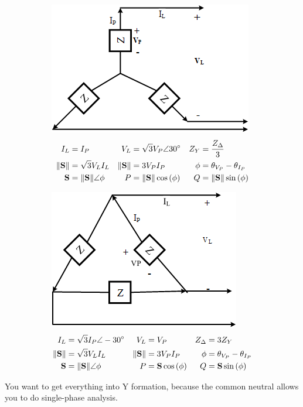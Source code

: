 \documentclass[10pt,letterpaper,final,twoside,notitlepage]{article}
\begin{document}
	\begin{figure} %
		\begin{subfigure}{0.5\textwidth} %
			\centering
			\includegraphics[scale=0.4]{3Phase-Y.png}
			\label{subfig:3 Phase-Y}
			\begin{align*}
				I_{L} &= I_{P} &
				V_{L} &= \sqrt{3} V_{P} \angle 30 \degree &
				Z_{Y} &= \frac{Z_{\Delta}}{3} \\
				\lVert \mathbf{S} \rVert &= \sqrt{3} V_{L} I_{L} &
				\lVert \mathbf{S} \rVert &= 3 V_{P} I_{P} &
				\phi &= \theta_{V_{P}} - \theta_{I_{P}} \\
				\mathbf{S} &= \lVert \mathbf{S} \rVert \angle \phi &
				P &= \lVert \mathbf{S} \rVert \cos \left( \phi \right) &
				Q &= \lVert \mathbf{S} \rVert \sin \left( \phi \right) \\
			\end{align*}
		\end{subfigure}
		\vline
		\begin{subfigure}{0.5\textwidth} %
			\centering
			\includegraphics[scale=0.4]{3Phase-Delta.png}
				\begin{align*}
					I_{L} &= \sqrt{3} I_{P} \angle -30 \degree &
					V_{L} &= V_{P} &
					Z_{\Delta} &= 3 Z_{Y} \\
					\lVert \mathbf{S} \rVert &= \sqrt{3} V_{L} I_{L} &
					\lVert \mathbf{S} \rVert &= 3 V_{P} I_{P} &
					\phi &= \theta_{V_{P}} - \theta_{I_{P}} \\
					\mathbf{S} &= \lVert \mathbf{S} \rVert \angle \phi &
					P &= \mathbf{S} \cos \left( \phi \right) &
					Q &= \mathbf{S} \sin \left( \phi \right) \\
				\end{align*}
			\label{subfig:3 Phase-Delta}
		\end{subfigure}
	\end{figure}
You want to get everything into Y formation, because the common neutral allows you to do single-phase analysis.
\vspace{-5mm}
\end{document}
